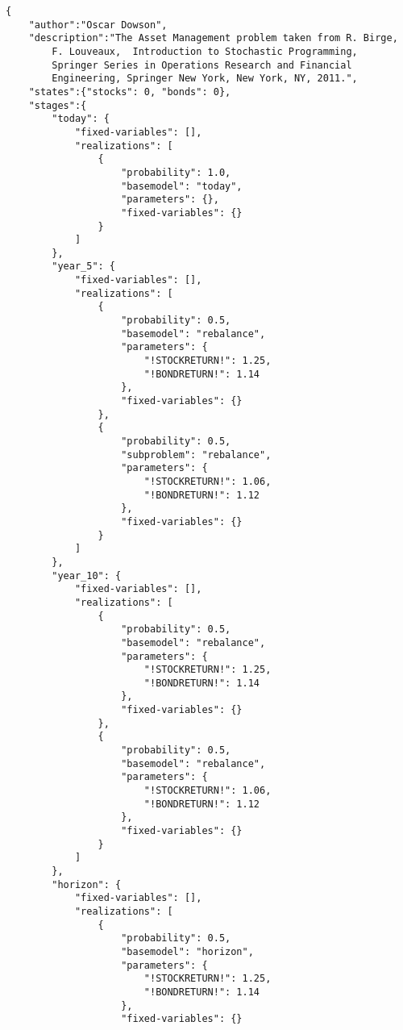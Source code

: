 \documentclass[final,1p,times]{elsarticle}
\begin{document}
\begin{Verbatim}[frame=single,label=asset\_management.sof]
{
    "author":"Oscar Dowson",
    "description":"The Asset Management problem taken from R. Birge,
        F. Louveaux,  Introduction to Stochastic Programming,
        Springer Series in Operations Research and Financial
        Engineering, Springer New York, New York, NY, 2011.",
    "states":{"stocks": 0, "bonds": 0},
    "stages":{
        "today": {
            "fixed-variables": [],
            "realizations": [
                {
                    "probability": 1.0,
                    "basemodel": "today",
                    "parameters": {},
                    "fixed-variables": {}
                }
            ]
        },
        "year_5": {
            "fixed-variables": [],
            "realizations": [
                {
                    "probability": 0.5,
                    "basemodel": "rebalance", 
                    "parameters": {
                        "!STOCKRETURN!": 1.25,
                        "!BONDRETURN!": 1.14
                    },
                    "fixed-variables": {}
                },
                {
                    "probability": 0.5,
                    "subproblem": "rebalance", 
                    "parameters": {
                        "!STOCKRETURN!": 1.06,
                        "!BONDRETURN!": 1.12
                    },
                    "fixed-variables": {}
                }
            ]
        },
        "year_10": {
            "fixed-variables": [],
            "realizations": [
                {
                    "probability": 0.5,
                    "basemodel": "rebalance", 
                    "parameters": {
                        "!STOCKRETURN!": 1.25,
                        "!BONDRETURN!": 1.14
                    },
                    "fixed-variables": {}
                },
                {
                    "probability": 0.5,
                    "basemodel": "rebalance", 
                    "parameters": {
                        "!STOCKRETURN!": 1.06,
                        "!BONDRETURN!": 1.12
                    },
                    "fixed-variables": {}
                }
            ]
        },
        "horizon": {
            "fixed-variables": [],
            "realizations": [
                {
                    "probability": 0.5,
                    "basemodel": "horizon", 
                    "parameters": {
                        "!STOCKRETURN!": 1.25,
                        "!BONDRETURN!": 1.14
                    },
                    "fixed-variables": {}

\end{Verbatim}
\end{document}
